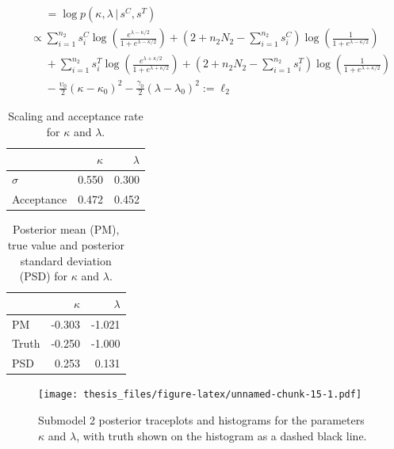 \documentclass[11pt,]{book}
\begin{document}
\begin{align}
&\phantom{\propto} = \log p(\kappa, \lambda \, | \, s^C, s^T) \nonumber \\
&\propto \sum_{i = 1}^{n_2} s_i^C \log \left(\frac{e^{\lambda - \kappa/2}}{1 + e^{\lambda - \kappa/2}}\right) + (2 + n_2N_2 - \sum_{i = 1}^{n_2} s_i^C) \log \left(\frac{1}{1 + e^{\lambda - \kappa/2}}\right) \nonumber \\
&\phantom{\propto} + \sum_{i = 1}^{n_2} s_i^T \log \left(\frac{e^{\lambda + \kappa/2}}{1 + e^{\lambda + \kappa/2}}\right) + (2 + n_2N_2 - \sum_{i = 1}^{n_2} s_i^T) \log \left(\frac{1}{1 + e^{\lambda + \kappa/2}}\right) \nonumber \\
&\phantom{\propto} - \frac{\upsilon_0}{2}(\kappa - \kappa_0)^2  - \frac{\gamma_0}{2}(\lambda - \lambda_0)^2 := \ell_2
\end{align}

\begin{table}[!h]

\caption{\label{tab:unnamed-chunk-13}Scaling and acceptance rate for $\kappa$ and $\lambda$.}
\centering
\begin{tabular}{lrr}
\toprule
  & $\kappa$ & $\lambda$\\
\midrule
$\sigma$ & 0.550 & 0.300\\
Acceptance & 0.472 & 0.452\\
\bottomrule
\end{tabular}
\end{table}

\begin{table}[!h]

\caption{\label{tab:unnamed-chunk-14}Posterior mean (PM), true value and posterior standard deviation (PSD) for $\kappa$ and $\lambda$.}
\centering
\begin{tabular}{lrr}
\toprule
  & $\kappa$ & $\lambda$\\
\midrule
PM & -0.303 & -1.021\\
Truth & -0.250 & -1.000\\
PSD & 0.253 & 0.131\\
\bottomrule
\end{tabular}
\end{table}

\begin{figure}
\centering
\texttt{[image: thesis\_files/figure-latex/unnamed-chunk-15-1.pdf]}
\caption{\label{fig:unnamed-chunk-15}Submodel 2 posterior traceplots and
histograms for the parameters \(\kappa\) and \(\lambda\), with truth
shown on the histogram as a dashed black line.}
\end{figure}
\end{document}
